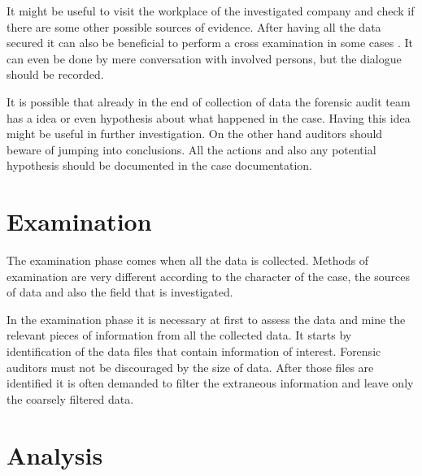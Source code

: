 It might be useful to visit the workplace of the investigated company and check if there are some other possible sources of evidence. After having all the data secured it can also be beneficial to perform a cross examination in some cases . It can even be done by mere conversation with involved persons, but the dialogue should be recorded.

It is possible that already in the end of collection of data the forensic audit team has a idea or even hypothesis about what happened in the case. Having this idea might be useful in further investigation. On the other hand auditors should beware of jumping into conclusions. All the actions and also any potential hypothesis should be documented in the case documentation. 


\section{Examination}

The examination phase comes when all the data is collected. Methods of examination are very different according to the character of the case, the sources of data and also the field that is investigated. 

In the examination phase it is necessary at first to assess the data and mine the relevant pieces of information from all the collected data. It starts by identification of the data files that contain information of interest. Forensic auditors must not be discouraged by the size of data. After those files are identified it is often demanded to filter the extraneous information and leave only the coarsely filtered data. 


\section{Analysis}

